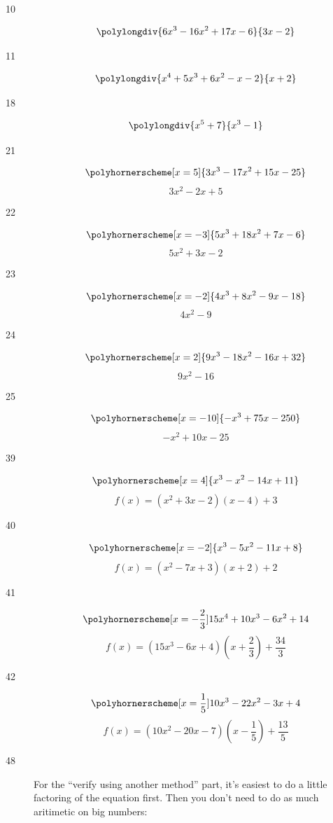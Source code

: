 \documentclass[fleqn,addpoints]{exam}
\begin{document}
\begin{description}
\item[10]
\[ 
  \polylongdiv{6x^3 - 16x^2 + 17x - 6}{3x-2} 
\]

\item[11]
\[ 
  \polylongdiv{x^4 + 5x^3 + 6x^2 - x - 2}{x+2} 
\]

\item[18]
\[ 
  \polylongdiv{x^5+7}{x^3-1} 
\]

\item[21]
\[
  \polyhornerscheme[x=5]{3x^3-17x^2+15x-25} \\
\]
\[
  3x^2 - 2x + 5
\]

\item[22]
\[
  \polyhornerscheme[x=-3]{5x^3+18x^2+7x-6} \\
\]
\[
  5x^2 + 3x - 2
\]

\item[23]
\[
  \polyhornerscheme[x=-2]{4x^3+8x^2-9x-18} \\
\]
\[
  4x^2-9
\]

\item[24]
\[
  \polyhornerscheme[x=2]{9x^3-18x^2-16x+32} \\
\]
\[
  9x^2-16
\]

\item[25]
\[
  \polyhornerscheme[x=-10]{-x^3+75x-250} \\
\]
\[
  -x^2+10x-25
\]

\item[39]
\[
  \polyhornerscheme[x=4]{x^3-x^2-14x+11} \\
\]
\[
  f(x) = (x^2+3x-2)(x-4) + 3
\]

\item[40]
\[
  \polyhornerscheme[x=-2]{x^3-5x^2-11x+8} \\
\]
\[
  f(x) = (x^2-7x+3)(x+2) + 2
\]

\item[41]
\[
  \polyhornerscheme[x=-\frac{2}{3}]{15x^4+10x^3-6x^2+14} \\
\]
\[
  f(x) = (15x^3 - 6x+4) \left( x+\frac{2}{3} \right) + \frac{34}{3}
\]

\item[42]
\[
  \polyhornerscheme[x=\frac{1}{5}]{10x^3-22x^2-3x+4} \\
\]
\[
  f(x) = (10x^2-20x-7) \left( x-\frac{1}{5} \right) + \frac{13}{5}
\]

\item[48]
For the ``verify using another method'' part, it's easiest to do a little factoring of the equation first.  Then you
don't need to do as much aritimetic on big numbers:


\end{description}
\end{document}
